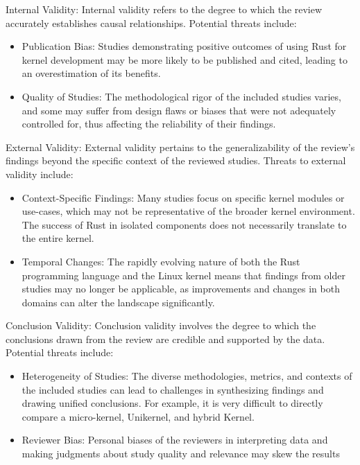 \documentclass[sigconf]{acmart}
\begin{document}
Internal Validity: Internal validity refers to the degree to which the review accurately establishes
causal relationships. Potential threats include:

\begin{itemize}
  \item Publication Bias: Studies demonstrating positive outcomes of using Rust for kernel
    development may be more likely to be published and cited, leading to an overestimation of its
    benefits.
  \item Quality of Studies: The methodological rigor of the included studies varies, and some may
    suffer from design flaws or biases that were not adequately controlled for, thus affecting the
    reliability of their findings.
\end{itemize}

External Validity: External validity pertains to the generalizability of the review's findings
beyond the specific context of the reviewed studies. Threats to external validity include:

\begin{itemize}
  \item Context-Specific Findings: Many studies focus on specific kernel modules or use-cases, which
    may not be representative of the broader kernel environment. The success of Rust in isolated
    components does not necessarily translate to the entire kernel.
  \item Temporal Changes: The rapidly evolving nature of both the Rust programming language and the
    Linux kernel means that findings from older studies may no longer be applicable, as improvements
    and changes in both domains can alter the landscape significantly.
\end{itemize}


Conclusion Validity: Conclusion validity involves the degree to which the conclusions drawn from the
review are credible and supported by the data. Potential threats include:

\begin{itemize}
  \item Heterogeneity of Studies: The diverse methodologies, metrics, and contexts of the included studies
    can lead to challenges in synthesizing findings and drawing unified conclusions. For example, it
    is very difficult to directly compare a micro-kernel, Unikernel, and hybrid Kernel.
  \item Reviewer Bias: Personal biases of the reviewers in interpreting data and making judgments
    about study quality and relevance may skew the results
\end{itemize}
\end{document}
